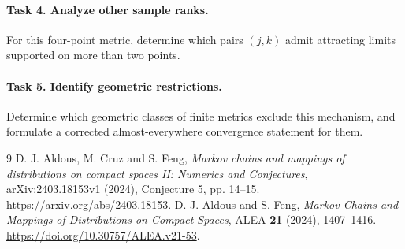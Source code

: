 \documentclass[11pt]{article}
\begin{document}
\paragraph{Task 4. Analyze other sample ranks.}
For this four-point metric, determine which pairs $(j,k)$ admit attracting
limits supported on more than two points.

\paragraph{Task 5. Identify geometric restrictions.}
Determine which geometric classes of finite metrics exclude this mechanism,
and formulate a corrected almost-everywhere convergence statement for them.

\begin{thebibliography}{9}
 D. J. Aldous, M. Cruz and S. Feng,
\emph{Markov chains and mappings of distributions on compact spaces II:
Numerics and Conjectures}, arXiv:2403.18153v1 (2024),
Conjecture 5, pp. 14--15.
\url{https://arxiv.org/abs/2403.18153}.
 D. J. Aldous and S. Feng,
\emph{Markov Chains and Mappings of Distributions on Compact Spaces},
ALEA \textbf{21} (2024), 1407--1416.
\url{https://doi.org/10.30757/ALEA.v21-53}.
\end{thebibliography}
\end{document}
